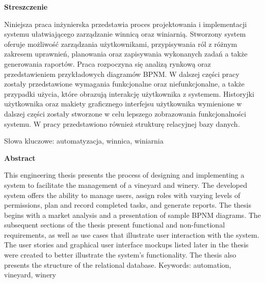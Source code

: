 \noindent \textbf{Streszczenie}

\vspace{0.25cm}
Niniejsza praca inżynierska przedstawia proces projektowania i implementacji systemu ułatwiającego zarządzanie winnicą oraz winiarnią.
Stworzony system oferuje możliwość zarządzania użytkownikami, przypisywania ról z różnym zakresem uprawnień, planowania oraz zapisywania wykonanych zadań a także generowania raportów.
Praca rozpoczyna się analizą rynkową oraz przedstawieniem przykładowych diagramów BPNM.
W dalszej części pracy zostały przedstawione wymagania funkcjonalne oraz niefunkcjonalne, a także przypadki użycia, które obrazują interakcję użytkownika z systemem.
Historyjki użytkownika oraz makiety graficznego interfejsu użytkownika wymienione w dalszej części zostały stworzone w celu lepszego zobrazowania funkcjonalności systemu.
W pracy przedstawiono również strukturę relacyjnej bazy danych.

\vspace{0.25cm}

\noindent Słowa kluczowe: automatyzacja, winnica, winiarnia


\vspace{2cm}

\noindent \textbf{Abstract}

\vspace{0.25cm}
This engineering thesis presents the process of designing and implementing a system to facilitate the management of a vineyard and winery.
The developed system offers the ability to manage users, assign roles with varying levels of permissions, plan and record completed tasks, and generate reports.
The thesis begins with a market analysis and a presentation of sample BPNM diagrams.
The subsequent sections of the thesis present functional and non-functional requirements, as well as use cases that illustrate user interaction with the system.
The user stories and graphical user interface mockups listed later in the thesis were created to better illustrate the system’s functionality.
The thesis also presents the structure of the relational database.
\vspace{0.25cm}
\newline
\noindent Keywords: automation, vineyard, winery